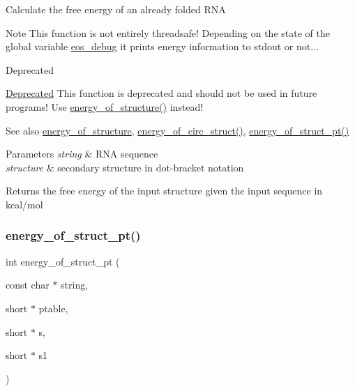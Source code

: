 Calculate the free energy of an already folded R\+NA

\begin{DoxyNote}{Note}
This function is not entirely threadsafe! Depending on the state of the global variable \hyperlink{group__eval_ga567530678f6260a1a649a5beca5da4c5}{eos\+\_\+debug} it prints energy information to stdout or not...~\newline
 
\end{DoxyNote}
\begin{DoxyRefDesc}{Deprecated}
\item[\hyperlink{deprecated__deprecated000060}{Deprecated}]This function is deprecated and should not be used in future programs! Use \hyperlink{group__eval_gaf93986cb3cb29770ec9cca69c9fab8cf}{energy\+\_\+of\+\_\+structure()} instead!\end{DoxyRefDesc}


\begin{DoxySeeAlso}{See also}
\hyperlink{group__eval_gaf93986cb3cb29770ec9cca69c9fab8cf}{energy\+\_\+of\+\_\+structure}, \hyperlink{group__eval_ga657222e2758c46bf13b416ef3032e417}{energy\+\_\+of\+\_\+circ\+\_\+struct()}, \hyperlink{group__eval_ga27ce6f68512d43bf1fe14a06c9d76d5c}{energy\+\_\+of\+\_\+struct\+\_\+pt()} 
\end{DoxySeeAlso}

\begin{DoxyParams}{Parameters}
{\em string} & R\+NA sequence \\
\hline
{\em structure} & secondary structure in dot-\/bracket notation \\
\hline
\end{DoxyParams}
\begin{DoxyReturn}{Returns}
the free energy of the input structure given the input sequence in kcal/mol 
\end{DoxyReturn}
\mbox{\label{group__eval_ga27ce6f68512d43bf1fe14a06c9d76d5c}} 
\subsubsection{\texorpdfstring{energy\+\_\+of\+\_\+struct\+\_\+pt()}{energy\_of\_struct\_pt()}}
{\footnotesize\ttfamily int energy\+\_\+of\+\_\+struct\+\_\+pt (\begin{DoxyParamCaption}\item[{const char $\ast$}]{string,  }\item[{short $\ast$}]{ptable,  }\item[{short $\ast$}]{s,  }\item[{short $\ast$}]{s1 }\end{DoxyParamCaption})}



